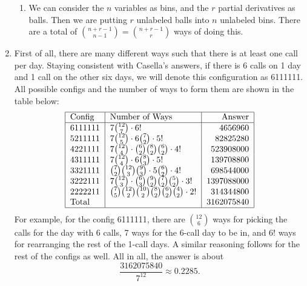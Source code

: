 \documentclass{article}
\begin{document}
\begin{enumerate}
\begin{enumerate}
        \item We can consider the $n$ variables as bins, and the $r$ partial derivatives as 
        balls. Then we are putting $r$ unlabeled balls into $n$ unlabeled bins. There are a 
        total of $\binom{n + r - 1}{n - 1} = \binom{n + r - 1}{r}$ ways of doing this.    
    \end{enumerate}

    \item First of all, there are many different ways such that there is at least one call per day. Staying consistent with Casella's answers, if there is 6 calls on 1 day and 1 call on 
    the other six days, we will denote this configuration as 6111111. All possible configs and 
    the number of ways to form them are shown in the table below:
    \[ \begin{tabular}{|l|l|r|}
        \hline
        \text{Config} & \text{Number of Ways} & \text{Answer} \\ 
        \hline
        6111111 & $7\binom{12}{7} \cdot 6!$ & 4656960 \\
        5211111 & $7\binom{12}{5} \cdot 6\binom{7}{2} \cdot 5! $ & 82825280 \\
        4221111 & $7\binom{12}{4} \cdot \binom{6}{2}\binom{8}{2}\binom{6}{2} \cdot 4!$ 
        & 523908000 \\
        4311111 & $7\binom{12}{4} \cdot 6\binom{8}{3} \cdot 5! $ & 139708800 \\
        3321111 & $\binom{7}{2}\binom{12}{3}\binom{9}{3} \cdot 5\binom{6}{2} \cdot 4!$ 
        & 698544000 \\
        3222111 & $7\binom{12}{3} \cdot \binom{6}{3}\binom{9}{2}\binom{7}{2}\binom{5}{2} \cdot 3!$ 
        & 1397088000 \\
        2222211 & $\binom{7}{5}\binom{12}{2}\binom{10}{2}\binom{8}{2}\binom{6}{2}\binom{4}{2}
        \cdot 2!$ & 314344800 \\
        Total & & 3162075840 \\
        \hline
    \end{tabular} \]
    For example, for the config 6111111, there are $\binom{12}{6}$ ways for picking the calls 
    for the day with 6 calls, 7 ways for the 6-call day to be in, and $6!$ ways for rearranging 
    the rest of the 1-call days. A similar reasoning follows for the rest of the configs as well.
    All in all, the answer is about
    \[ \frac{3162075840}{7^{12}} \approx 0.2285. \]

\end{enumerate}
\end{document}
